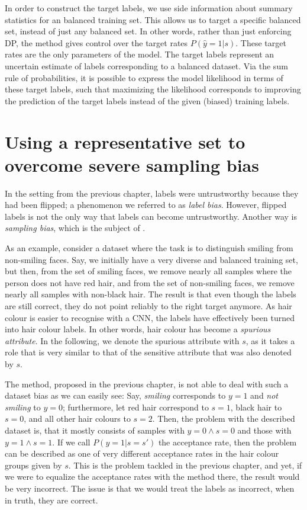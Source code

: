In order to construct the target labels,
we use side information about summary statistics for an balanced training set.
This allows us to target a specific balanced set, instead of just any balanced set.
In other words, rather than just enforcing \ac{DP}, the method gives control over the target rates \(P(\hat{y}=1|s)\).
These target rates are the only parameters of the model.
The target labels represent an uncertain estimate of labels corresponding to a balanced dataset.
Via the sum rule of probabilities, it is possible to express the model likelihood in terms of these target labels,
such that maximizing the likelihood corresponds to improving the prediction of the target labels
instead of the given (biased) training labels.

\section{Using a representative set to overcome severe sampling bias}\label{sec:nifr}
In the setting from the previous chapter,
labels were untrustworthy because they had been flipped;
a phenomenon we referred to as \emph{label bias}.
However, flipped labels is not the only way that labels can become untrustworthy.
Another way is \emph{sampling bias}, which is the subject of .

As an example, consider a dataset where the task is to distinguish smiling from non-smiling faces.
Say, we initially have a very diverse and balanced training set,
but then, from the set of smiling faces, we remove nearly all samples where the person does not have red hair,
and from the set of non-smiling faces, we remove nearly all samples with non-black hair.
The result is that even though the labels are still correct, they do not point reliably to the right target anymore.
As hair colour is easier to recognise with a \ac{CNN}, the labels have effectively been turned into hair colour labels.
In other words, hair colour has become a \emph{spurious attribute}.
In the following, we denote the spurious attribute with \(s\),
as it takes a role that is very similar to that of the sensitive attribute that was also denoted by \(s\).

The method, proposed in the previous chapter,
is not able to deal with such a dataset bias as we can easily see:
Say, \emph{smiling} corresponds to \(y=1\) and \emph{not smiling} to \(y=0\);
furthermore, let red hair correspond to \(s=1\), black hair to \(s=0\), and all other hair colours to \(s=2\).
Then, the problem with the described dataset is, that it mostly consists of samples with \(y=0\wedge s=0\)
and those with \(y=1\wedge s=1\).
If we call \(P(y=1|s=s')\) the acceptance rate,
then the problem can be described as one of very different acceptance rates in the hair colour groups given by \(s\).
This is the problem tackled in the previous chapter,
and yet, if we were to equalize the acceptance rates with the method there,
the result would be very incorrect.
The issue is that we would treat the labels as incorrect, when in truth, they are correct.

